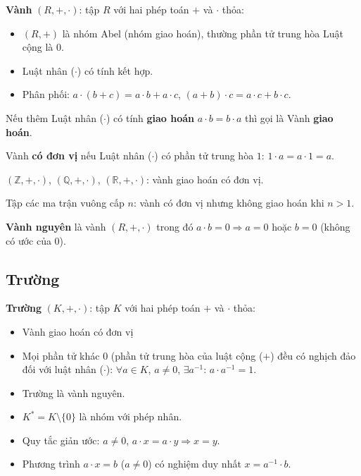 \documentclass[12pt,a4paper]{article}
\begin{document}
\begin{dinhnghia}
  \textbf{Vành} $(R, +, \cdot)$: tập $R$ với hai phép toán $+$ và $\cdot$ thỏa:
  \begin{itemize}
    \item $(R, +)$ là nhóm Abel (nhóm giao hoán), thường phần tử trung hòa Luật cộng là $0$.
    \item Luật nhân ($\cdot$) có tính kết hợp.
    \item Phân phối: $a \cdot (b + c) = a \cdot b + a \cdot c$, $(a + b) \cdot c = a \cdot c + b \cdot c$.
  \end{itemize}
  Nếu thêm Luật nhân ($\cdot$) có tính \textbf{giao hoán} $a \cdot b = b \cdot a$ thì gọi là Vành \textbf{giao hoán}.
  
  Vành \textbf{có đơn vị} nếu Luật nhân ($\cdot$) có phần tử trung hòa $1$: $1 \cdot a = a \cdot 1 = a$.
\end{dinhnghia}

\begin{vidu}
  $(\mathbb{Z}, +, \cdot)$, $(\mathbb{Q}, +, \cdot)$, $(\mathbb{R}, +, \cdot)$: vành giao hoán có đơn vị. 
  
  Tập các ma trận vuông cấp $n$: vành có đơn vị nhưng không giao hoán khi $n > 1$.
\end{vidu}

\begin{dinhnghia}
  \textbf{Vành nguyên} là vành $(R, +, \cdot)$ trong đó $a \cdot b = 0 \Rightarrow a = 0$ hoặc $b = 0$ (không có ước của 0).
\end{dinhnghia}

\subsection{Trường}

\begin{dinhnghia}
  \textbf{Trường} $(K, +, \cdot)$: tập $K$ với hai phép toán $+$ và $\cdot$ thỏa:
  \begin{itemize}
    \item Vành giao hoán có đơn vị
    \item Mọi phần tử khác $0$ (phần tử trung hòa của luật cộng ($+$) đều có nghịch đảo đối với luật nhân ($\cdot$): $\forall a \in K$, $a \ne 0$, $\exists a^{-1}$: $a \cdot a^{-1} = 1$.
  \end{itemize}
\end{dinhnghia}

\begin{tinhchat}[title={Tính chất của trường}]
  \begin{itemize}
    \item Trường là vành nguyên.
    \item $K^* = K \setminus \{0\}$ là nhóm với phép nhân.
    \item Quy tắc giản ước: $a \ne 0$, $a \cdot x = a \cdot y \Rightarrow x = y$.
    \item Phương trình $a \cdot x = b$ ($a \ne 0$) có nghiệm duy nhất $x = a^{-1} \cdot b$.
  \end{itemize}
\end{tinhchat}
\end{document}
